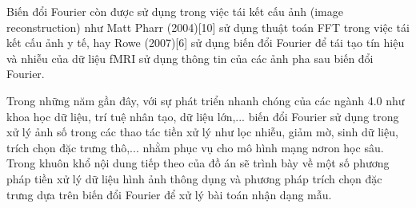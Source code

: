 \par Biến đổi Fourier còn được sử dụng trong việc tái kết cấu ảnh (image reconstruction) như Matt Pharr (2004)[10] sử dụng thuật toán FFT trong việc tái kết cấu ảnh y tế, hay Rowe (2007)[6] sử dụng biến đổi Fourier để tái tạo tín hiệu và nhiễu của dữ liệu fMRI sử dụng thông tin của các ảnh pha sau biến đổi Fourier.
\par Trong những năm gần đây, với sự phát triển nhanh chóng của các ngành 4.0 như khoa học dữ liệu, trí tuệ nhân tạo, dữ liệu lớn,... biến đổi Fourier sử dụng trong xử lý ảnh số trong các thao tác tiền xử lý như lọc nhiễu, giảm mờ, sinh dữ liệu, trích chọn đặc trưng thô,... nhằm phục vụ cho mô hình mạng nơron học sâu. Trong khuôn khổ nội dung tiếp theo của đồ án sẽ trình bày về một số phương pháp tiền xử lý dữ liệu hình ảnh thông dụng và phương pháp trích chọn đặc trưng dựa trên biến đổi Fourier để xử lý bài toán nhận dạng mẫu.




